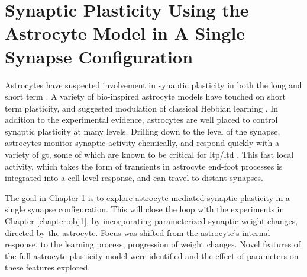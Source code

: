 \chapter{Synaptic Plasticity Using the Astrocyte Model in A Single Synapse
  Configuration} \label{chapter:obj2}

Astrocytes have suspected involvement in synaptic plasticity in both the
long \parencite{min_2012} and short term \parencite{pitta_2012}. A variety of
bio-inspired astrocyte models have touched on short term plasticity, and
suggested modulation of classical Hebbian learning \parencite{pitta_2016}. In
addition to the experimental evidence, astrocytes are well placed to control
synaptic plasticity at many levels. Drilling down to the level of the
synapse, astrocytes monitor synaptic activity chemically, and respond
quickly with a variety of \gls{gt}, some of which are known to be
critical for \gls{ltp}/\gls{ltd} \parencite{min_2012}. This fast local activity, which takes
the form of \ca transients in astrocyte end-foot processes is integrated
into a cell-level response, and can travel to distant synapses.

The goal in Chapter \ref{chapter:obj2} is to explore astrocyte mediated synaptic
plasticity in a single synapse configuration. This will close the loop with the
experiments in Chapter \ref{chapter:obj1}, by incorporating parameterized
synaptic weight changes, directed by the astrocyte. Focus was shifted from the
astrocyte's internal response, to the learning process, progression of weight
changes. Novel features of the full astrocyte plasticity model were
identified and the effect of parameters on these features explored.


